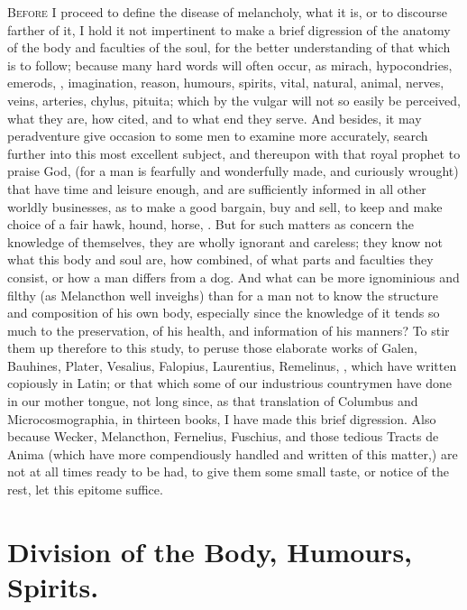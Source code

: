 {\lettrine{B}{efore} I proceed to define the disease of melancholy, what it is, or to
discourse farther of it, I hold it not impertinent to make a brief
digression of the anatomy of the body and faculties of the soul, for
the better understanding of that which is to follow; because many hard
words will often occur, as mirach, hypocondries, emerods, \etc{},
imagination, reason, humours, spirits, vital, natural, animal, nerves,
veins, arteries, chylus, pituita; which by the vulgar will not so
easily be perceived, what they are, how cited, and to what end they
serve. And besides, it may peradventure give occasion to some men to
examine more accurately, search further into this most excellent
subject, and thereupon with that royal prophet to praise God, (for
a man is fearfully and wonderfully made, and curiously wrought) that
have time and leisure enough, and are sufficiently informed in all
other worldly businesses, as to make a good bargain, buy and sell, to
keep and make choice of a fair hawk, hound, horse, \etc{}. But for such
matters as concern the knowledge of themselves, they are wholly
ignorant and careless; they know not what this body and soul are, how
combined, of what parts and faculties they consist, or how a man
differs from a dog. And what can be more ignominious and filthy (as
Melancthon well inveighs) than for a man not to know the structure
and composition of his own body, especially since the knowledge of it
tends so much to the preservation, of his health, and information of
his manners? To stir them up therefore to this study, to peruse those
elaborate works of Galen, Bauhines, Plater, Vesalius, Falopius,
Laurentius, Remelinus, \etc{}, which have written copiously in Latin; or
that which some of our industrious countrymen have done in our mother
tongue, not long since, as that translation of Columbus and 
Microcosmographia, in thirteen books, I have made this brief
digression. Also because Wecker, Melancthon, Fernelius,
 Fuschius, and those tedious Tracts de Anima (which have more
compendiously handled and written of this matter,) are not at all times
ready to be had, to give them some small taste, or notice of the rest,
let this epitome suffice.

\section[Division of the Body]{Division of the Body, Humours, Spirits.}

}
